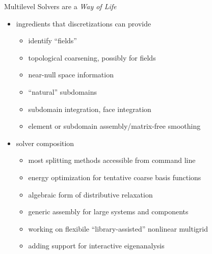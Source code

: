 \documentclass{beamer}
\begin{document}
\begin{frame}{Multilevel Solvers are a \emph{Way of Life}}
  \begin{itemize}
  \item ingredients that discretizations can provide
    \begin{itemize}
    \item identify ``fields''
    \item topological coarsening, possibly for fields
    \item near-null space information
    \item ``natural'' subdomains
    \item subdomain integration, face integration
    \item element or subdomain assembly/matrix-free smoothing
    \end{itemize}
  \item solver composition
    \begin{itemize}
    \item most splitting methods accessible from command line
    \item energy optimization for tentative coarse basis functions
    \item algebraic form of distributive relaxation
    \item generic assembly for large systems and components
    \item working on flexibile ``library-assisted'' nonlinear multigrid
    \item adding support for interactive eigenanalysis
    \end{itemize}
  \end{itemize}
\end{frame}
\end{document}

